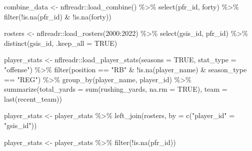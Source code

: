\documentclass[
  letterpaper,
]{krantz}
\newenvironment{Shaded}{\begin{snugshade}}{\end{snugshade}}
\newcommand{\AttributeTok}[1]{\textcolor[rgb]{0.40,0.45,0.13}{#1}}
\newcommand{\ConstantTok}[1]{\textcolor[rgb]{0.56,0.35,0.01}{#1}}
\newcommand{\DecValTok}[1]{\textcolor[rgb]{0.68,0.00,0.00}{#1}}
\newcommand{\FunctionTok}[1]{\textcolor[rgb]{0.28,0.35,0.67}{#1}}
\newcommand{\NormalTok}[1]{\textcolor[rgb]{0.00,0.23,0.31}{#1}}
\newcommand{\OtherTok}[1]{\textcolor[rgb]{0.00,0.23,0.31}{#1}}
\newcommand{\SpecialCharTok}[1]{\textcolor[rgb]{0.37,0.37,0.37}{#1}}
\newcommand{\StringTok}[1]{\textcolor[rgb]{0.13,0.47,0.30}{#1}}
\begin{document}
\begin{Shaded}
\begin{Highlighting}[]
\NormalTok{combine\_data }\OtherTok{\textless{}{-}}\NormalTok{ nflreadr}\SpecialCharTok{::}\FunctionTok{load\_combine}\NormalTok{() }\SpecialCharTok{\%\textgreater{}\%}
  \FunctionTok{select}\NormalTok{(pfr\_id, forty) }\SpecialCharTok{\%\textgreater{}\%}
  \FunctionTok{filter}\NormalTok{(}\SpecialCharTok{!}\FunctionTok{is.na}\NormalTok{(pfr\_id) }\SpecialCharTok{\&} \SpecialCharTok{!}\FunctionTok{is.na}\NormalTok{(forty))}

\NormalTok{rosters }\OtherTok{\textless{}{-}}\NormalTok{ nflreadr}\SpecialCharTok{::}\FunctionTok{load\_rosters}\NormalTok{(}\DecValTok{2000}\SpecialCharTok{:}\DecValTok{2022}\NormalTok{) }\SpecialCharTok{\%\textgreater{}\%}
  \FunctionTok{select}\NormalTok{(gsis\_id, pfr\_id) }\SpecialCharTok{\%\textgreater{}\%}
  \FunctionTok{distinct}\NormalTok{(gsis\_id, }\AttributeTok{.keep\_all =} \ConstantTok{TRUE}\NormalTok{)}

\NormalTok{player\_stats }\OtherTok{\textless{}{-}}\NormalTok{ nflreadr}\SpecialCharTok{::}\FunctionTok{load\_player\_stats}\NormalTok{(}\AttributeTok{seasons =} \ConstantTok{TRUE}\NormalTok{,}
                                            \AttributeTok{stat\_type =} \StringTok{"offense"}\NormalTok{) }\SpecialCharTok{\%\textgreater{}\%}
  \FunctionTok{filter}\NormalTok{(position }\SpecialCharTok{==} \StringTok{"RB"} \SpecialCharTok{\&} \SpecialCharTok{!}\FunctionTok{is.na}\NormalTok{(player\_name) }\SpecialCharTok{\&}
\NormalTok{           season\_type }\SpecialCharTok{==} \StringTok{"REG"}\NormalTok{) }\SpecialCharTok{\%\textgreater{}\%}
  \FunctionTok{group\_by}\NormalTok{(player\_name, player\_id) }\SpecialCharTok{\%\textgreater{}\%}
  \FunctionTok{summarize}\NormalTok{(}\AttributeTok{total\_yards =} \FunctionTok{sum}\NormalTok{(rushing\_yards, }\AttributeTok{na.rm =} \ConstantTok{TRUE}\NormalTok{),}
            \AttributeTok{team =} \FunctionTok{last}\NormalTok{(recent\_team))}

\NormalTok{player\_stats }\OtherTok{\textless{}{-}}\NormalTok{ player\_stats }\SpecialCharTok{\%\textgreater{}\%}
  \FunctionTok{left\_join}\NormalTok{(rosters, }\AttributeTok{by =} \FunctionTok{c}\NormalTok{(}\StringTok{"player\_id"} \OtherTok{=} \StringTok{"gsis\_id"}\NormalTok{))}

\NormalTok{player\_stats }\OtherTok{\textless{}{-}}\NormalTok{ player\_stats }\SpecialCharTok{\%\textgreater{}\%}
  \FunctionTok{filter}\NormalTok{(}\SpecialCharTok{!}\FunctionTok{is.na}\NormalTok{(pfr\_id))}


\end{Highlighting}
\end{Shaded}
\end{document}
